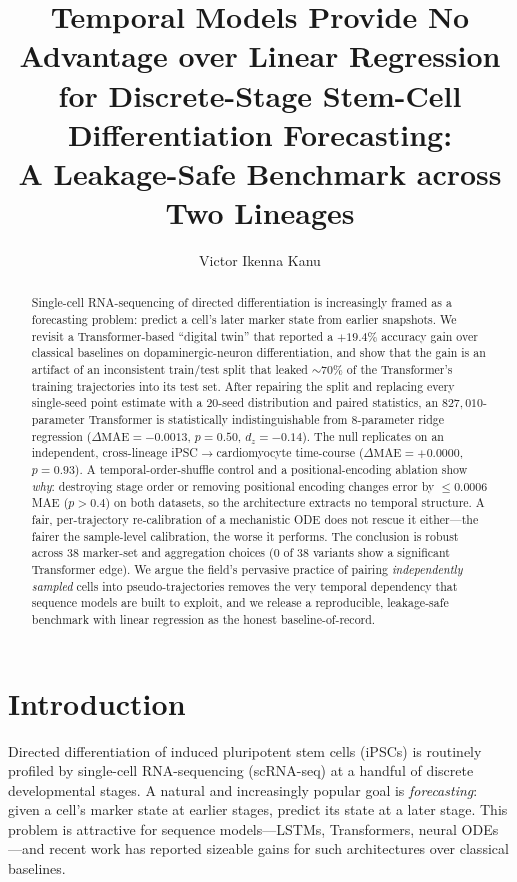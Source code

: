 \documentclass[11pt]{article}
\title{\textbf{Temporal Models Provide No Advantage over Linear Regression\\
for Discrete-Stage Stem-Cell Differentiation Forecasting:\\
A Leakage-Safe Benchmark across Two Lineages}}
\author[1]{Victor Ikenna Kanu}
\affil[1]{Kumoh National Institute of Technology \quad \texttt{vkanu@kumoh.ac.kr}}
\date{}
\newcommand{\dz}{d_{z}}
\begin{document}
\maketitle

\begin{abstract}
\noindent
Single-cell RNA-sequencing of directed differentiation is increasingly framed as a
forecasting problem: predict a cell's later marker state from earlier snapshots.
We revisit a Transformer-based ``digital twin'' that reported a $+19.4\%$ accuracy
gain over classical baselines on dopaminergic-neuron differentiation, and show that
the gain is an artifact of an inconsistent train/test split that leaked $\sim$70\%
of the Transformer's training trajectories into its test set. After repairing the
split and replacing every single-seed point estimate with a $20$-seed distribution
and paired statistics, an $827{,}010$-parameter Transformer is statistically
indistinguishable from $8$-parameter ridge regression
($\Delta\mathrm{MAE}=-0.0013$, $p=0.50$, $\dz=-0.14$). The null replicates on an
independent, cross-lineage iPSC$\rightarrow$cardiomyocyte time-course
($\Delta\mathrm{MAE}=+0.0000$, $p=0.93$). A temporal-order-shuffle control and a
positional-encoding ablation show \emph{why}: destroying stage order or removing
positional encoding changes error by $\le 0.0006$ MAE ($p>0.4$) on both datasets,
so the architecture extracts no temporal structure. A fair, per-trajectory
re-calibration of a mechanistic ODE does not rescue it either---the fairer the
sample-level calibration, the worse it performs. The conclusion is robust across
$38$ marker-set and aggregation choices ($0$ of $38$ variants show a significant
Transformer edge). We argue the field's pervasive practice of pairing
\emph{independently sampled} cells into pseudo-trajectories removes the very
temporal dependency that sequence models are built to exploit, and we release a
reproducible, leakage-safe benchmark with linear regression as the honest
baseline-of-record.
\end{abstract}

\section{Introduction}
Directed differentiation of induced pluripotent stem cells (iPSCs) is routinely
profiled by single-cell RNA-sequencing (scRNA-seq) at a handful of discrete
developmental stages. A natural and increasingly popular goal is \emph{forecasting}:
given a cell's marker state at earlier stages, predict its state at a later stage.
This problem is attractive for sequence models---LSTMs, Transformers, neural
ODEs---and recent work has reported sizeable gains for such architectures over
classical baselines.
\end{document}
